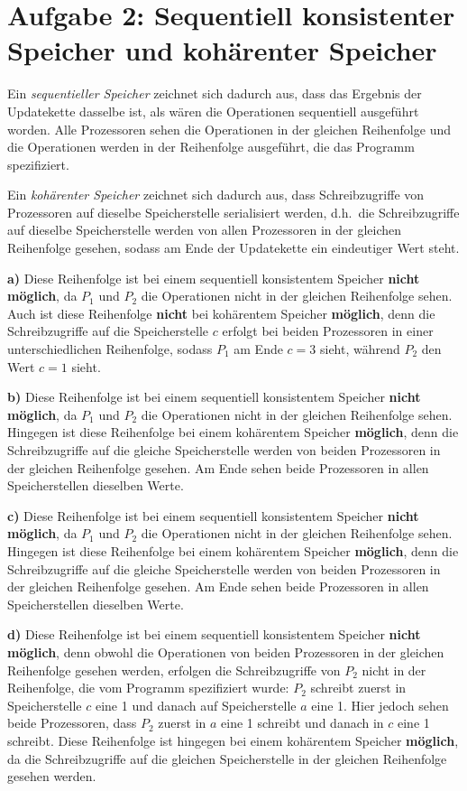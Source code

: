 \chapter{Aufgabe 2: Sequentiell konsistenter Speicher und kohärenter Speicher}

Ein \emph{sequentieller Speicher} zeichnet sich dadurch aus, dass das Ergebnis der Updatekette dasselbe ist, als wären die Operationen sequentiell ausgeführt worden. Alle Prozessoren sehen die Operationen in der gleichen Reihenfolge und die Operationen werden in der Reihenfolge ausgeführt, die das Programm spezifiziert.

Ein \emph{kohärenter Speicher} zeichnet sich dadurch aus, dass Schreibzugriffe von Prozessoren auf dieselbe Speicherstelle serialisiert werden, d.h.~die Schreibzugriffe auf dieselbe Speicherstelle werden von allen Prozessoren in der gleichen Reihenfolge gesehen, sodass am Ende der Updatekette ein eindeutiger Wert steht.\medskip 

\textbf{a)} Diese Reihenfolge ist bei einem sequentiell konsistentem Speicher \textbf{nicht möglich}, da $P_1$ und $P_2$ die Operationen nicht in der gleichen Reihenfolge sehen. Auch ist diese Reihenfolge \textbf{nicht} bei kohärentem Speicher \textbf{möglich}, denn die Schreibzugriffe auf die Speicherstelle $c$ erfolgt bei beiden Prozessoren in einer unterschiedlichen Reihenfolge, sodass $P_1$ am Ende $c=3$ sieht, während $P_2$ den Wert $c=1$ sieht.\medskip 

\textbf{b)} Diese Reihenfolge ist bei einem sequentiell konsistentem Speicher \textbf{nicht möglich}, da $P_1$ und $P_2$ die Operationen nicht in der gleichen Reihenfolge sehen. Hingegen ist diese Reihenfolge bei einem kohärentem Speicher \textbf{möglich}, denn die Schreibzugriffe auf die gleiche Speicherstelle werden von beiden Prozessoren in der gleichen Reihenfolge gesehen. Am Ende sehen beide Prozessoren in allen Speicherstellen dieselben Werte.\medskip 

\textbf{c)} Diese Reihenfolge ist bei einem sequentiell konsistentem Speicher \textbf{nicht möglich}, da $P_1$ und $P_2$ die Operationen nicht in der gleichen Reihenfolge sehen. Hingegen ist diese Reihenfolge bei einem kohärentem Speicher \textbf{möglich}, denn die Schreibzugriffe auf die gleiche Speicherstelle werden von beiden Prozessoren in der gleichen Reihenfolge gesehen. Am Ende sehen beide Prozessoren in allen Speicherstellen dieselben Werte.\medskip 

\textbf{d)} Diese Reihenfolge ist bei einem sequentiell konsistentem Speicher \textbf{nicht möglich}, denn obwohl die Operationen von beiden Prozessoren in der gleichen Reihenfolge gesehen werden, erfolgen die Schreibzugriffe von $P_2$ nicht in der Reihenfolge, die vom Programm spezifiziert wurde: $P_2$ schreibt zuerst in Speicherstelle $c$ eine 1 und danach auf Speicherstelle $a$ eine 1. Hier jedoch sehen beide Prozessoren, dass $P_2$ zuerst in $a$ eine 1 schreibt und danach in $c$ eine 1 schreibt. Diese Reihenfolge ist hingegen bei einem kohärentem Speicher \textbf{möglich}, da die Schreibzugriffe auf die gleichen Speicherstelle in der gleichen Reihenfolge gesehen werden.\medskip 

